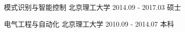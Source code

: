 


\begin{cvhonors}


\cvhonor
{模式识别与智能控制} %
{北京理工大学} %
{2014.09 - 2017.03} %
{硕士} %
    

\cvhonor
{电气工程与自动化}  %
{北京理工大学}%
{2010.09 - 2014.07} %
{本科} %


\end{cvhonors}